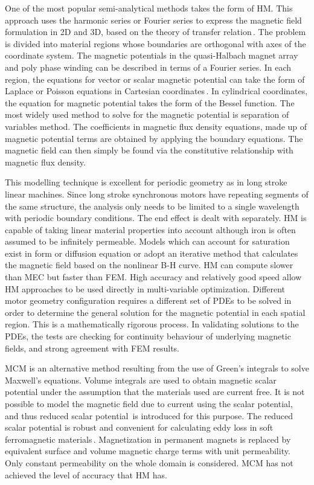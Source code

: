     
        One of the most popular semi-analytical methods takes the form of \ac{HM}. This approach uses the harmonic series or Fourier series to express the magnetic field formulation in 2D and 3D, based on the theory of transfer relation\,\cite{Melcher1981}. The problem is divided into material regions whose boundaries are orthogonal with axes of the coordinate system. The magnetic potentials in the quasi-Halbach magnet array and poly phase winding can be described in terms of a Fourier series. In each region, the equations for vector or scalar magnetic potential can take the form of Laplace or Poisson equations in Cartesian coordinates\,\cite{Trumper1993,Wang1999}. In cylindrical coordinates, the equation for magnetic potential takes the form of the Bessel function\cite{Gysen2008,Ruddy2011a,Gysen2011a}. The most widely used method to solve for the magnetic potential is separation of variables method. The coefficients in magnetic flux density equations, made up of magnetic potential terms are obtained by applying the boundary equations. The magnetic field can then simply be found via the constitutive relationship with magnetic flux density.
        
        
        This modelling technique is excellent for periodic geometry as in long stroke linear machines. Since long stroke synchronous motors have repeating segments of the same structure, the analysis only needs to be limited to a single wavelength with periodic boundary conditions. The end effect is dealt with separately. \acs{HM} is capable of taking linear material properties into account although iron is often assumed to be infinitely permeable. Models which can account for saturation exist in form or diffusion equation or adopt an iterative method that calculates the magnetic field based on the nonlinear B-H curve. \acs{HM} can compute slower than \acs{MEC} but faster than \acs{FEM}. High accuracy and relatively good speed allow HM approaches to be used directly in multi-variable optimization. Different motor geometry configuration requires a different set of \acsp{PDE} to be solved in order to determine the general solution for the magnetic potential in each spatial region. This is a mathematically rigorous process. In validating solutions to the \acsp{PDE}, the tests are checking for continuity behaviour of underlying magnetic fields, and strong agreement with \acs{FEM} results.
        
        
        \ac{MCM} is an alternative method resulting from the use of Green’s integrals to solve Maxwell's equations. Volume integrals are used to obtain magnetic scalar potential under the assumption that the materials used are current free. It is not possible to model the magnetic field due to current using the scalar potential, and thus reduced scalar potential\,\cite{Gong2009} is introduced for this purpose. The reduced scalar potential is robust and convenient for calculating eddy loss in soft ferromagnetic materials\,\cite{Xu2004,Bowler1987,Rubinacci2004}. Magnetization in permanent magnets is replaced by equivalent surface and volume magnetic charge terms with unit permeability. Only constant permeability on the whole domain is considered. \acs{MCM} has not achieved the level of accuracy that \acs{HM} has.
        
